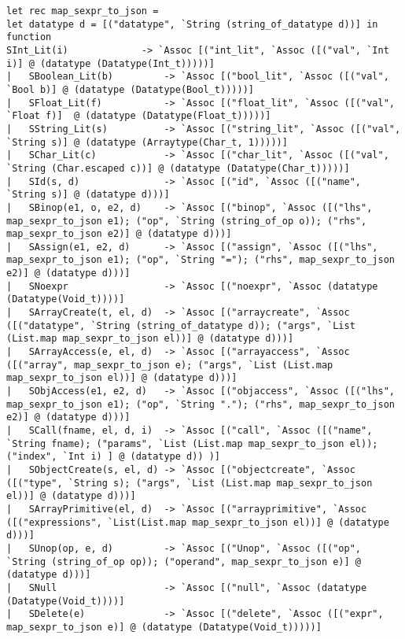 \begin{verbatim}
let rec map_sexpr_to_json = 
let datatype d = [("datatype", `String (string_of_datatype d))] in
function
SInt_Lit(i)          	-> `Assoc [("int_lit", `Assoc ([("val", `Int i)] @ (datatype (Datatype(Int_t)))))]
|   SBoolean_Lit(b)      	-> `Assoc [("bool_lit", `Assoc ([("val", `Bool b)] @ (datatype (Datatype(Bool_t)))))]
|   SFloat_Lit(f)        	-> `Assoc [("float_lit", `Assoc ([("val", `Float f)]  @ (datatype (Datatype(Float_t)))))]
|   SString_Lit(s)       	-> `Assoc [("string_lit", `Assoc ([("val", `String s)] @ (datatype (Arraytype(Char_t, 1)))))]
|   SChar_Lit(c)         	-> `Assoc [("char_lit", `Assoc ([("val", `String (Char.escaped c))] @ (datatype (Datatype(Char_t)))))]
|   SId(s, d)               -> `Assoc [("id", `Assoc ([("name", `String s)] @ (datatype d)))]
|   SBinop(e1, o, e2, d)    -> `Assoc [("binop", `Assoc ([("lhs", map_sexpr_to_json e1); ("op", `String (string_of_op o)); ("rhs", map_sexpr_to_json e2)] @ (datatype d)))]
|   SAssign(e1, e2, d)      -> `Assoc [("assign", `Assoc ([("lhs", map_sexpr_to_json e1); ("op", `String "="); ("rhs", map_sexpr_to_json e2)] @ (datatype d)))]
|   SNoexpr              	-> `Assoc [("noexpr", `Assoc (datatype (Datatype(Void_t))))]
|   SArrayCreate(t, el, d)  -> `Assoc [("arraycreate", `Assoc ([("datatype", `String (string_of_datatype d)); ("args", `List (List.map map_sexpr_to_json el))] @ (datatype d)))]
|   SArrayAccess(e, el, d)  -> `Assoc [("arrayaccess", `Assoc ([("array", map_sexpr_to_json e); ("args", `List (List.map map_sexpr_to_json el))] @ (datatype d)))]
|   SObjAccess(e1, e2, d)   -> `Assoc [("objaccess", `Assoc ([("lhs", map_sexpr_to_json e1); ("op", `String "."); ("rhs", map_sexpr_to_json e2)] @ (datatype d)))]
|   SCall(fname, el, d, i)  -> `Assoc [("call", `Assoc ([("name", `String fname); ("params", `List (List.map map_sexpr_to_json el)); ("index", `Int i) ] @ (datatype d)) )]
|   SObjectCreate(s, el, d) -> `Assoc [("objectcreate", `Assoc ([("type", `String s); ("args", `List (List.map map_sexpr_to_json el))] @ (datatype d)))]
|   SArrayPrimitive(el, d)  -> `Assoc [("arrayprimitive", `Assoc ([("expressions", `List(List.map map_sexpr_to_json el))] @ (datatype d)))]
|   SUnop(op, e, d)         -> `Assoc [("Unop", `Assoc ([("op", `String (string_of_op op)); ("operand", map_sexpr_to_json e)] @ (datatype d)))]
|   SNull               	-> `Assoc [("null", `Assoc (datatype (Datatype(Void_t))))] 
| 	SDelete(e) 				-> `Assoc [("delete", `Assoc ([("expr", map_sexpr_to_json e)] @ (datatype (Datatype(Void_t)))))]


\end{verbatim}
